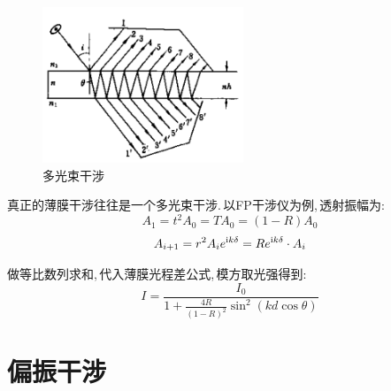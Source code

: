 \phantom{something}
\begin{figure}
\centering
\vspace{-0.5cm}
\includegraphics[width=6cm]{image/14-1-8.png}
\caption{多光束干涉}
\end{figure}
真正的薄膜干涉往往是一个多光束干涉.\,以FP干涉仪为例,\,透射振幅为:
\[A_1=t^2A_0=TA_0=(1-R)A_0\]
\[A_{i+1}=r^2A_i e^{{\rm i} k\delta}=Re^{{\rm i} k\delta}\cdot A_i\]

做等比数列求和,\,代入薄膜光程差公式,\,模方取光强得到:
\[I=\frac{I_0}{1+\frac{4R}{(1-R)^2}\sin^2 (kd\cos\theta)}\]

\vspace{0.4cm}


\section{偏振干涉}

